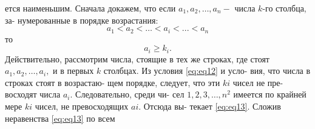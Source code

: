 \documentclass[12pt]{article}
\begin{document}
\begin{multicols}{2}
ется наименьшим. Сначала докажем, что\linebreak
если $a_{1}, a_{2}, \ldots, a_{n} -$ числа $k$-го столбца, за- \linebreak
нумерованные в порядке возрастания:
\begin{equation}
    a_{1} < a_{2} < \ldots < a_{i} < ... < a_{n}
    \label{eq:eq12}
\end{equation}
то
\begin{equation}
    a_{i} \geq k_{i}.
    \label{eq:eq13}
\end{equation}
Действительно, рассмотрим числа, стоящие\linebreak
в тех же строках, где стоят $a_{1}, a_{2}, \ldots, a_{i},$\linebreak
и в первых $k$ столбцах. Из условия \eqref{eq:eq12} и усло-\linebreak
вия, что числа в строках стоят в возрастаю-\linebreak
щем порядке, следует, что эти $ki$ чисел не пре-\linebreak
восходят числа $a_{i}$. Следовательно, среди чи-\linebreak
сел $1, 2, 3, \ldots, n^{2}$ имеется по крайней мере\linebreak
$ki$ чисел, не превосходящих $ai$. Отсюда вы-\linebreak
текает \eqref{eq:eq13}. Сложив неравенства \eqref{eq:eq13} по всем\linebreak
\end{multicols}
\end{document}
